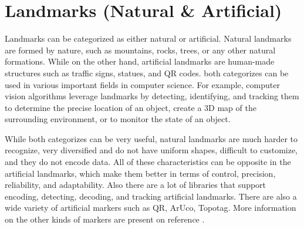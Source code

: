 \section{Landmarks (Natural \& Artificial)}

Landmarks can be categorized as either natural or artificial. Natural landmarks
are formed by nature, such as mountains, rocks, trees, or any other natural
formations. While on the other hand, artificial landmarks are human-made
structures such as traffic signs, statues, and QR codes. both categorizes can be used in various important fields in computer science. For example, computer vision algorithms leverage landmarks by detecting, identifying, and tracking them to determine the precise location of an object, create a 3D map of the surrounding environment, or to monitor the state of an object.

While both categorizes can be very useful, natural landmarks are much harder to recognize, very diversified and do not have uniform shapes, difficult to customize, and they do not encode data. All of these characteristics can be opposite in the artificial landmarks, which make them better in terms of control, precision, reliability, and adaptability. Also there are a lot of libraries that support encoding, detecting, decoding, and tracking artificial landmarks. There are also a wide variety of artificial markers such as QR, ArUco, Topotag. More information on the other kinds of markers are present on reference \cite{Fiducial2021}.





